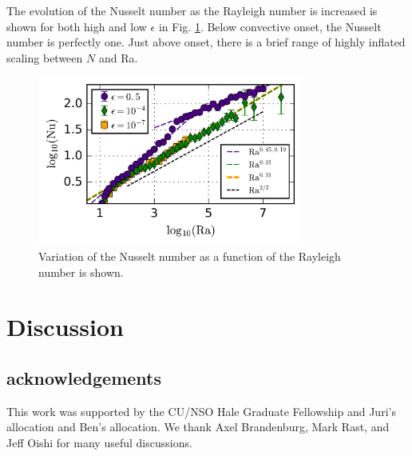 \documentclass[aps, prl, twocolumn, groupedaddress, amsfonts, amssymb, amsmath]{revtex4-1}
\begin{document}
The evolution of the Nusselt number as the Rayleigh number is increased is shown for both high and low
$\epsilon$ in Fig. \ref{fig:nu_v_ra}.  Below convective onset, the Nusselt number is perfectly one. Just above
onset, there is a brief range of highly inflated scaling between $N$ and Ra. 

\begin{figure}[t]
\includegraphics[width=3.4375in]{./figs/nu_v_ra.png}
\caption{Variation of the Nusselt number as a function of the Rayleigh number is shown.
\label{fig:nu_v_ra} }
\end{figure}

\section{Discussion}
\label{sec:discussion}


\subsection{acknowledgements}
This work was supported by the CU/NSO Hale Graduate Fellowship and Juri's allocation and Ben's allocation.
We thank Axel Brandenburg, Mark Rast, and Jeff Oishi for many useful discussions.


\end{document}
